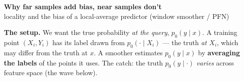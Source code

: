 \documentclass[11pt]{article}
\begin{document}
\begin{center}
  {\LARGE\bfseries Why far samples add bias, near samples don't}\\[2pt]
  {\color{muted}\small locality and the bias of a local-average predictor (window smoother / PFN)}
\end{center}

\textbf{The setup.}
We want the true probability \emph{at the query}, $p_0(y\mid x)$.
A training point $(X_i,Y_i)$ has its label drawn from $p_0(\cdot\mid X_i)$ --- the truth \emph{at $X_i$},
which may differ from the truth at $x$. A smoother estimates $p_0(y\mid x)$ by \textbf{averaging the labels}
of the points it uses. The catch: the truth $p_0(y\mid\cdot)$ \emph{varies} across feature space (the wave below).

\end{document}
